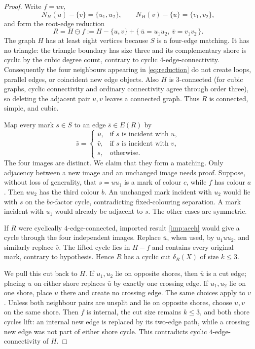 \documentclass[11pt]{article}
\theoremstyle{definition}
\theoremstyle{remark}
\begin{document}
\begin{proof}
Write \(f=uv\),
\[
 N_H(u)-\{v\}=\{u_1,u_2\},\qquad
 N_H(v)-\{u\}=\{v_1,v_2\},
\]
and form the root-edge reduction
\[
 R=H\mathbin{\ominus}f
   :=H-\{u,v\}+\{\,\bar u=u_1u_2,\ \bar v=v_1v_2\,\}.
 \tag{5.1}\label{eq:reduction}
\]
The graph \(H\) has at least eight vertices because \(S\) is a
four-edge matching.  It has no triangle: the triangle boundary has size
three and its complementary shore is cyclic by the cubic degree count,
contrary to cyclic \(4\)-edge-connectivity.  Consequently the four
neighbours appearing in \eqref{eq:reduction} do not create loops,
parallel edges, or coincident new edge objects.  Also \(H\) is
3-connected (for cubic graphs, cyclic connectivity and ordinary
connectivity agree through order three), so deleting the adjacent pair
\(u,v\) leaves a connected graph.  Thus \(R\) is connected, simple, and
cubic.

Map every mark \(s\in S\) to an edge \(\bar s\in E(R)\) by
\[
 \bar s=
 \begin{cases}
  \bar u,&\text{if \(s\) is incident with \(u\)},\\
  \bar v,&\text{if \(s\) is incident with \(v\)},\\
  s,&\text{otherwise}.
 \end{cases}
 \tag{5.2}\label{eq:mark-image}
\]
The four images are distinct.  We claim that they form a matching.
Only adjacency between a new image and an unchanged image needs proof.
Suppose, without loss of generality, that \(s=uu_1\) is a mark of
colour \(c\), while \(f\) has colour \(a\).  Then \(uu_2\) has the
third colour \(b\).  An unchanged mark incident with \(u_2\) would lie
with \(s\) on the \(bc\)-factor cycle, contradicting fixed-colouring
separation.  A mark incident with \(u_1\) would already be adjacent to
\(s\).  The other cases are symmetric.

If \(R\) were cyclically \(4\)-edge-connected, imported result
\ref{imp:aeeh} would give a cycle through the four independent images.
Replace \(\bar u\), when used, by \(u_1uu_2\), and similarly replace
\(\bar v\).  The lifted cycle lies in \(H-f\) and contains every
original mark, contrary to hypothesis.  Hence \(R\) has a cyclic cut
\(\delta_R(X)\) of size \(k\leq3\).

We pull this cut back to \(H\).  If \(u_1,u_2\) lie on opposite shores,
then \(\bar u\) is a cut edge; placing \(u\) on either shore replaces
\(\bar u\) by exactly one crossing edge.  If \(u_1,u_2\) lie on one
shore, place \(u\) there and create no crossing edge.  The same choices
apply to \(v\).  Unless both neighbour pairs are unsplit and lie on
opposite shores, choose \(u,v\) on the same shore.  Then \(f\) is
internal, the cut size remains \(k\leq3\), and both shore cycles lift:
an internal new edge is replaced by its two-edge path, while a crossing
new edge was not part of either shore cycle.  This contradicts cyclic
\(4\)-edge-connectivity of \(H\).


\end{proof}
\end{document}
